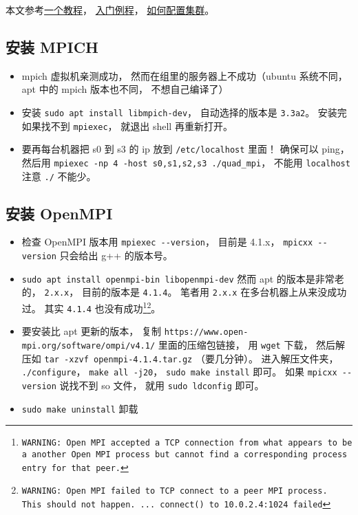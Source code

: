 
\begin{issues}
\issueDraft
\end{issues}

本文参考\href{https://www.codingame.com/playgrounds/349/introduction-to-mpi/introduction-to-distributed-computing}{一个教程}， \href{https://people.sc.fsu.edu/~jburkardt/cpp_src/hello_mpi/hello_mpi.html}{入门例程}， \href{https://mpitutorial.com/tutorials/running-an-mpi-cluster-within-a-lan/}{如何配置集群}。

\subsection{安装 MPICH}
\begin{itemize}
\item mpich 虚拟机亲测成功， 然而在组里的服务器上不成功（ubuntu 系统不同， apt 中的 mpich 版本也不同， 不想自己编译了）
\item 安装 \verb`sudo apt install libmpich-dev`， 自动选择的版本是 \verb`3.3a2`。 安装完如果找不到 \verb`mpiexec`， 就退出 shell 再重新打开。
\item 要再每台机器把 s0 到 s3 的 ip 放到 \verb`/etc/localhost` 里面！ 确保可以 ping， 然后用 \verb`mpiexec -np 4 -host s0,s1,s2,s3 ./quad_mpi`， 不能用 \verb`localhost` 注意 \verb`./` 不能少。
\end{itemize}

\subsection{安装 OpenMPI}
\begin{itemize}
\item 检查 OpenMPI 版本用 \verb`mpiexec --version`， 目前是 4.1.x， \verb`mpicxx --version` 只会给出 g++ 的版本号。
\item \verb`sudo apt install openmpi-bin libopenmpi-dev` 然而 apt 的版本是非常老的， \verb`2.x.x`， 目前的版本是 \verb`4.1.4`。 笔者用 \verb`2.x.x` 在多台机器上从来没成功过。 其实 \verb`4.1.4` 也没有成功\footnote{\verb`WARNING: Open MPI accepted a TCP connection from what appears to be a another Open MPI process but cannot find a corresponding process entry for that peer.`}\footnote{\verb`WARNING: Open MPI failed to TCP connect to a peer MPI process.  This should not happen. ... connect() to 10.0.2.4:1024 failed`}。
\item 要安装比 apt 更新的版本， 复制 \verb`https://www.open-mpi.org/software/ompi/v4.1/` 里面的压缩包链接， 用 \verb`wget` 下载， 然后解压如 \verb`tar -xzvf openmpi-4.1.4.tar.gz` （要几分钟）。 进入解压文件夹， \verb`./configure`， \verb`make all -j20`， \verb`sudo make install` 即可。 如果 \verb`mpicxx --version` 说找不到 so 文件， 就用 \verb`sudo ldconfig` 即可。
\item \verb`sudo make uninstall` 卸载
\end{itemize}

